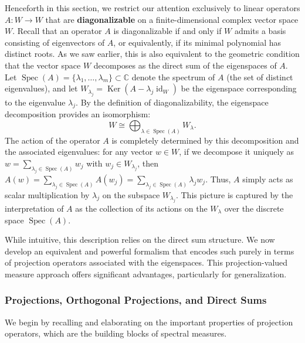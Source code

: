 Henceforth in this section, we restrict our attention exclusively to linear operators $A: W \to W$ that are \textbf{diagonalizable} on a finite-dimensional complex vector space $W$. Recall that an operator $A$ is diagonalizable if and only if $W$ admits a basis consisting of eigenvectors of $A$, or equivalently, if its minimal polynomial has distinct roots. As we saw earlier, this is also equivalent to the geometric condition that the vector space $W$ decomposes as the direct sum of the eigenspaces of $A$. Let $\operatorname{Spec}(A) = \{\lambda_1, \dots, \lambda_m\} \subset \mathbb{C}$ denote the spectrum of $A$ (the set of distinct eigenvalues), and let $W_{\lambda_j} = \operatorname{Ker}(A - \lambda_j \operatorname{id}_W)$ be the eigenspace corresponding to the eigenvalue $\lambda_j$. By the definition of diagonalizability, the eigenspace decomposition provides an isomorphism:
\begin{equation*}
W \cong \bigoplus_{\lambda \in \operatorname{Spec}(A)} W_{\lambda}.
\end{equation*}
The action of the operator $A$ is completely determined by this decomposition and the associated eigenvalues: for any vector $w \in W$, if we decompose it uniquely as $w = \sum_{\lambda_j \in \operatorname{Spec}(A)} w_j$ with $w_j \in W_{\lambda_j}$, then $A(w) = \sum_{\lambda_j \in \operatorname{Spec}(A)} A(w_j) = \sum_{\lambda_j \in \operatorname{Spec}(A)} \lambda_j w_j$. Thus, $A$ simply acts as scalar multiplication by $\lambda_j$ on the subspace $W_{\lambda_j}$. This picture is captured by the interpretation of $A$ as the collection of its actions on the  $W_\lambda$ over the discrete space $\operatorname{Spec}(A)$.

While intuitive, this description relies on the direct sum structure. We now develop an equivalent and powerful formalism that encodes such  purely in terms of projection operators associated with the eigenspaces. This projection-valued measure approach offers significant advantages, particularly for generalization.

\subsubsection{Projections, Orthogonal Projections, and Direct Sums}
\label{subsec:projections}

We begin by recalling and elaborating on the important properties of projection operators, which are the building blocks of spectral measures.

